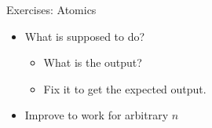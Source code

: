 \documentclass[aspectratio=43]{beamer}
\begin{document}
\begin{frame}[fragile]{Exercises: Atomics}
    \begin{itemize}
        \item What is  supposed to do?
        \begin{itemize}
            \item What is the output?
            \item Fix it to get the expected output.
        \end{itemize}
    \item Improve  to work for arbitrary $n$
    \end{itemize}
\end{frame}
\end{document}

